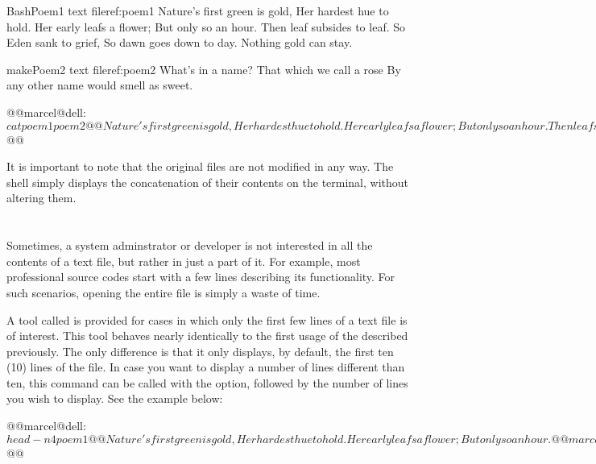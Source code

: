 \begin{command_line_float}{Bash}{Poem1 text file}{ref:poem1}
Nature's first green is gold,
Her hardest hue to hold.
Her early leafs a flower;
But only so an hour.
Then leaf subsides to leaf.
So Eden sank to grief,
So dawn goes down to day.
Nothing gold can stay.
\end{command_line_float}

\begin{command_line_float}{make}{Poem2 text file}{ref:poem2}
What's in a name? That which we call a rose
By any other name would smell as sweet.
\end{command_line_float}


\begin{command_line}[make]
@@marcel@dell:~$ cat poem1 poem2@@
Nature's first green is gold,
Her hardest hue to hold.
Her early leafs a flower;
But only so an hour.
Then leaf subsides to leaf.
So Eden sank to grief,
So dawn goes down to day.
Nothing gold can stay.
What's in a name? That which we call a rose
By any other name would smell as sweet.
@@marcel@dell:~$ @@
\end{command_line}

It is important to note that the original files are not modified in any way. The shell simply displays the concatenation of their contents on the terminal, without altering them.

\section{}
 Sometimes, a system adminstrator or developer is not interested in all the contents of a text file, but rather in just a part of it. For example, most professional source codes start with a few lines describing its functionality. For such scenarios, opening the entire file is simply a waste of time.

 A tool called  is provided for cases in which only the first few lines of a text file is of interest. This tool behaves nearly identically to the first usage of the  described previously. The only difference is that it only displays, by default, the first ten (10) lines of the file. In case you want to display a number of lines different than ten, this command can be called with the  option, followed by the number of lines you wish to display. See the example below:

\begin{command_line}[Bash]
@@marcel@dell:~$ head -n 4 poem1@@
Nature's first green is gold,
Her hardest hue to hold.
Her early leafs a flower;
But only so an hour.
@@marcel@dell:~$ @@
\end{command_line}

